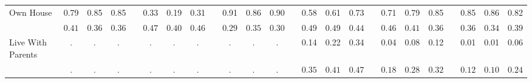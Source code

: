 \begin{center}
{\begin{longtable}{L{12em} c c c p{1.2em} c c c p{1.2em} c c c p{1.2em} c c c p{1.2em} c c c p{1.2em} c c c}
Own House & 0.79 &      0.85 &      0.85 & &      0.33 &      0.19 &      0.31 & &      0.91 &      0.86 &      0.90 & &      0.58 &      0.61 &      0.73 & &      0.71 &      0.79 &      0.85 & &      0.85 &      0.86 &      0.82 \\*
& $\mathit{     0.41}$ & $\mathit{     0.36}$ & $\mathit{     0.36}$ & & $\mathit{     0.47}$ & $\mathit{     0.40}$ & $\mathit{     0.46}$ & & $\mathit{     0.29}$ & $\mathit{     0.35}$ & $\mathit{     0.30}$ & & $\mathit{     0.49}$ & $\mathit{     0.49}$ & $\mathit{     0.44}$ & & $\mathit{     0.46}$ & $\mathit{     0.41}$ & $\mathit{     0.36}$ & & $\mathit{     0.36}$ & $\mathit{     0.34}$ & $\mathit{     0.39}$ \\[.7em]
Live With Parents & . &         . &         . & &         . &         . &         . & &         . &         . &         . & &      0.14 &      0.22 &      0.34 & &      0.04 &      0.08 &      0.12 & &      0.01 &      0.01 &      0.06 \\*
& $\mathit{        .}$ & $\mathit{        .}$ & $\mathit{        .}$ & & $\mathit{        .}$ & $\mathit{        .}$ & $\mathit{        .}$ & & $\mathit{        .}$ & $\mathit{        .}$ & $\mathit{        .}$ & & $\mathit{     0.35}$ & $\mathit{     0.41}$ & $\mathit{     0.47}$ & & $\mathit{     0.18}$ & $\mathit{     0.28}$ & $\mathit{     0.32}$ & & $\mathit{     0.12}$ & $\mathit{     0.10}$ & $\mathit{     0.24}$ \\[.7em]
\hline
\end{longtable}
}
\end{center}
